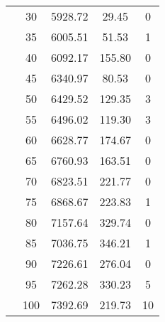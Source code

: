 \begin{table}[h!]
\begin{tabular}{lcccc}
    & 30 & 5928.72  & 29.45  & 0 \\ \cline{2-5} 
    & 35 & 6005.51  & 51.53  & 1 \\ \cline{2-5} 
    & 40 & 6092.17  & 155.80 & 0 \\ \cline{2-5} 
    & 45 & 6340.97  & 80.53  & 0 \\ \cline{2-5} 
    & 50 & 6429.52  & 129.35 & 3 \\ \cline{2-5} 
    & 55 & 6496.02  & 119.30 & 3 \\ \cline{2-5} 
    & 60 & 6628.77  & 174.67 & 0 \\ \cline{2-5} 
    & 65 & 6760.93  & 163.51 & 0 \\ \cline{2-5} 
    & 70 & 6823.51  & 221.77 & 0 \\ \cline{2-5} 
    & 75 & 6868.67  & 223.83 & 1 \\ \cline{2-5} 
    & 80 & 7157.64  & 329.74 & 0 \\ \cline{2-5} 
    & 85 & 7036.75  & 346.21 & 1 \\ \cline{2-5} 
    & 90 & 7226.61  & 276.04 & 0 \\ \cline{2-5} 
    & 95 & 7262.28  & 330.23 & 5 \\ \cline{2-5} 
    & 100 & 7392.69  & 219.73 & 10 \\ \hline
\end{tabular}
\end{table}



